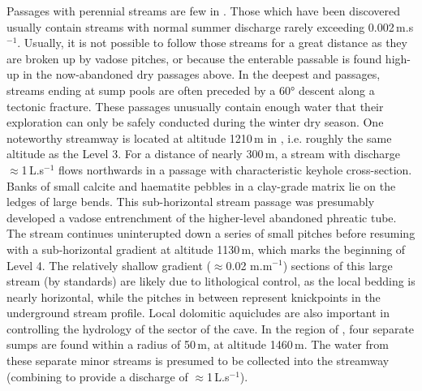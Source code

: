 Passages with perennial streams are few in . 
Those which have been discovered usually contain streams with normal summer discharge rarely exceeding  0.002\,m.s$^{-1}$. 
Usually, it is not possible to follow those streams for a great distance as they are broken up by vadose pitches, or because the enterable passable is found high-up in the now-abandoned dry passages above. 
In the deepest  and  passages, streams ending at sump pools are often preceded by a 60° descent along a tectonic fracture. 
These passages unusually contain enough water that their exploration can only be safely conducted during the winter dry season. 
One noteworthy streamway is located at altitude 1210\,m in , i.e. roughly the same altitude as the Level 3. For a distance of nearly 300\,m, a stream with discharge $\approx$1\,L.s$^{-1}$ flows northwards in a passage with characteristic keyhole cross-section. 
Banks of small calcite and haematite pebbles in a clay-grade matrix lie on the ledges of large bends. 
This sub-horizontal stream passage was presumably developed a vadose entrenchment of the higher-level abandoned phreatic tube. 
The stream continues uninterupted down a series of small pitches before resuming with a sub-horizontal gradient at altitude 1130\,m, which marks the beginning of Level 4. 
The relatively shallow gradient ($\approx$0.02 m.m$^{-1}$) sections of this large stream (by  standards) are likely due to lithological control, as the local bedding is nearly horizontal, while the pitches in between represent knickpoints in the underground stream profile.
Local dolomitic aquicludes are also important in controlling the hydrology of the  sector of the cave. In the region of , four separate sumps are found within a radius of 50\,m, at altitude 1460\,m. The water from these separate minor streams is presumed to be collected into the  streamway (combining to provide a discharge of  $\approx$1\,L.s$^{-1}$).

